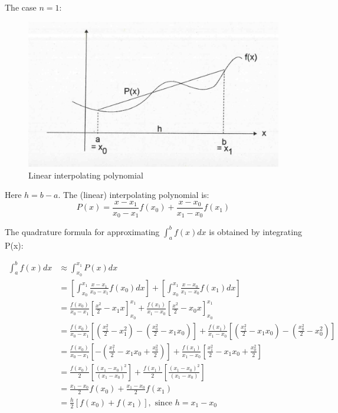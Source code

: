 \documentclass [titlepage,12pt,letter] {article}
\begin{document}
The case $n=1$: 

\begin{figure} 
  \centering
  \includegraphics[scale=0.6]{linear_interpolating}
  \caption{Linear interpolating polynomial}
  \label{fig:linear}
\end{figure}
\noindent 
Here $h = b -a$. The (linear) interpolating polynomial is: 
\[
P(x) = \frac{x-x_1}{x_0-x_1}f(x_0) + \frac{x-x_0}{x_1-x_0} f(x_1) 
\]

The quadrature formula for approximating $\int_a^{b} f(x)dx$ is obtained by integrating P(x): 

\begin{align*} 
\int_{a}^{b} f(x)dx &\approx \int_{x_0}^{x_1} P(x)dx \\ 
   &= \left [ \int_{x_0}^{x_1} \frac{x-x_1}{x_0-x_1}f(x_0)dx \right ] + \left[ \int_{x_0}^{x_1} \frac{x-x_0}{x_1-x_0}f(x_1)dx \right ] \\
   &= \frac{f(x_0)}{x_0-x_1} \left [ \frac{x^2}{2} - x_1x \right ]_{x_0}^{x_1} + \frac{f(x_1)}{x_1-x_0} \left [ \frac{x^2}{2} - x_0x \right ]_{x_0}^{x_1} \\ 
   &= \frac{f(x_0)}{x_0-x_1} \left [ (\frac{x_1^2}{2} - x_1^2)- (\frac{x_0^2}{2} - x_1x_0)\right ] + \frac{f(x_1)}{x_1-x_0} \left [ (\frac{x_1^2}{2} - x_1x_0)- (\frac{x_0^2}{2} - x_0^2) \right ] \\ 
   &= \frac{f(x_0)}{x_0-x_1} \left [ -(\frac{x_1^2}{2} - x_1x_0 + \frac{x_0^2}{2}) \right ] + \frac{f(x_1)}{x_1-x_0} \left [ \frac{x_1^2}{2} - x_1x_0 + \frac{x_0^2}{2} \right ] \\ 
   &= \frac{f(x_0)}{2}\left [\frac{(x_1-x_0)^2}{(x_1-x_0)}\right ]+\frac{f(x_1)}{2}\left [\frac{(x_1-x_0)^2}{(x_1-x_0)}\right ] \\
   &= \frac{x_1 - x_0}{2}f(x_0) + \frac{x_1 - x_0}{2}f(x_1) \\ 
   &= \frac{h}{2} [f(x_0) + f(x_1)], \mbox{ since } h= x_1-x_0  
\end{align*} 
\end{document}
